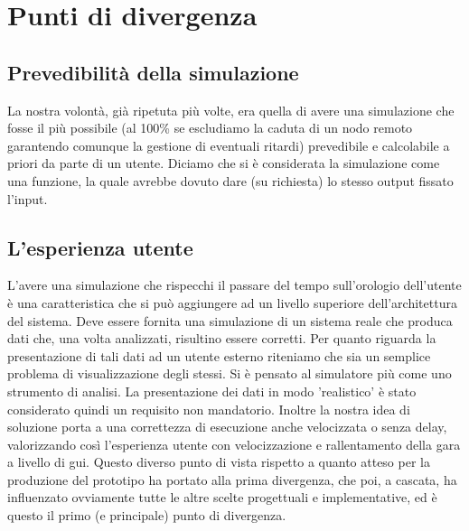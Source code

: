 \section{Punti di divergenza}
\subsection{Prevedibilità della simulazione}
La nostra volontà, già ripetuta più volte, era quella di avere una simulazione che fosse il più possibile (al 100\% se escludiamo la caduta di un nodo remoto garantendo comunque la gestione di eventuali ritardi) prevedibile e calcolabile a priori da parte di un utente. Diciamo che si è considerata la simulazione come una funzione, la quale avrebbe dovuto dare (su richiesta) lo stesso output fissato l'input.
\subsection{L'esperienza utente}
L’avere una simulazione che rispecchi il passare del tempo sull’orologio dell’utente è una caratteristica che si può aggiungere ad un livello superiore dell’architettura del sistema. Deve essere fornita una simulazione di un sistema reale che produca dati che, una volta analizzati, risultino essere corretti. Per quanto riguarda la presentazione di tali dati ad un utente esterno riteniamo che sia un semplice problema di visualizzazione degli stessi. Si è pensato al simulatore più come uno strumento di analisi. La presentazione dei dati in modo 'realistico' è stato considerato quindi un requisito non mandatorio. Inoltre la nostra idea di soluzione porta a una  correttezza di esecuzione anche velocizzata o senza delay, valorizzando così l’esperienza utente con velocizzazione e rallentamento della gara a livello di gui.
Questo diverso punto di vista rispetto a quanto atteso per la produzione del prototipo ha portato alla prima divergenza, che poi, a cascata, ha influenzato ovviamente tutte le altre scelte progettuali e implementative, ed è questo il primo (e principale) punto di divergenza.
